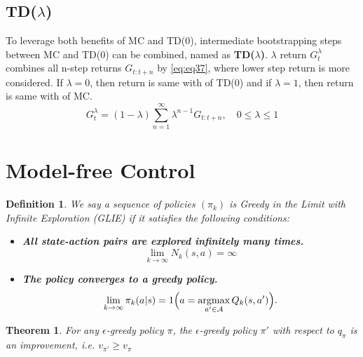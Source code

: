 \documentclass[
	10pt, %
]{article}
\newtheorem{theorem}{Theorem}[section]
\newtheorem{definition}{Definition}[section]
\theoremstyle{plain}
\newcommand{\tb}[1]{\textbf{#1}}
\numberwithin{equation}{subsection} %
\newcommand{\argmax}{\mathop{\mathrm{argmax}}\limits}
\begin{document}
\subsection{TD($\lambda$)}
To leverage both benefits of MC and TD(0), intermediate bootstrapping steps between MC and TD(0) can be combined, named as \tb{TD($\lambda$)}. $\lambda$ return $G^\lambda_t$ combines all n-step returns $G_{t:t+n}$ by \cref{eq:eq37}, where lower step return is more considered. If $\lambda = 0$, then return is same with of TD(0) and if $\lambda = 1$, then return is same with of MC.
\begin{equation} \label{eq:eq37}
    G^\lambda_t = (1-\lambda) \sum_{n=1}^\infty \lambda^{n-1}G_{t:t+n}, \quad 0 \leq \lambda \leq 1
\end{equation}


\section{Model-free Control} \label{sec:model-free control}

\begin{definition} \label{def:def1}
    We say a sequence of policies $(\pi_k)$ is \emph{Greedy in the Limit with Infinite Exploration (GLIE)} if it satisfies the following conditions:

\begin{itemize}
    \item \tb{All state-action pairs are explored infinitely many times.} 
    \[
        \lim_{k \to \infty} N_k(s, a) = \infty
    \]

    \item \tb{The policy converges to a greedy policy.}
    \[
        \lim_{k \to \infty} \pi_k(a|s)
        = 1\Bigl(a = \argmax_{a' \in \mathcal{A}} Q_k(s, a')\Bigr).
    \]
\end{itemize}
\end{definition}

\begin{theorem} \label{thm:thm2}
    For any $\epsilon$-greedy policy $\pi$, the $\epsilon$-greedy policy $\pi'$ with respect to $q_\pi$ is an improvement, i.e. $v_{\pi'} \geq v_\pi$
\end{theorem}
\end{document}
